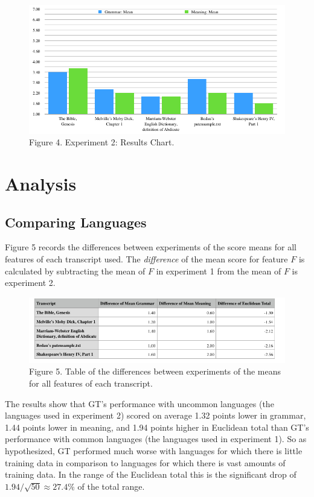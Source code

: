 \documentclass{article}
\newcommand{\forcenewpage}{\clearpage \newpage}
\begin{document}
\begin{figure}[h]
\centering
\includegraphics[width=15cm,keepaspectratio]{images/exp2-results-chart.png}
\captionsetup{labelformat=empty} \caption{Figure 4. Experiment 2: Results Chart.}
\end{figure}

\forcenewpage
\section{Analysis}\subsection{Comparing Languages}


Figure 5 records the differences between experiments of the score means for all features of each transcript used.
The \textit{difference} of the mean score for feature $F$ is calculated by subtracting the mean of $F$ in experiment 1 from the mean of $F$ is experiment 2.



\begin{figure}[h]
\centering
\includegraphics[width=15cm,keepaspectratio]{images/lang-diffs-all-table.png}
\captionsetup{labelformat=empty} \caption{Figure 5. Table of the differences between experiments of the means for all features of each transcript.}
\end{figure}



The results show that GT's performance with uncommon languages (the languages used in experiment 2) scored on average 1.32 points lower in grammar, 1.44 points lower in meaning, and 1.94 points higher in Euclidean total than GT's performance with common languages (the languages used in experiment 1). So as hypothesized, GT performed much worse with languages for which there is little training data in comparison to languages for which there is vast amounts of training data. In the range of the Euclidean total this is the significant drop of $  1.94/ \sqrt{50} \approx 27.4\%  $ of the total range.
\end{document}

